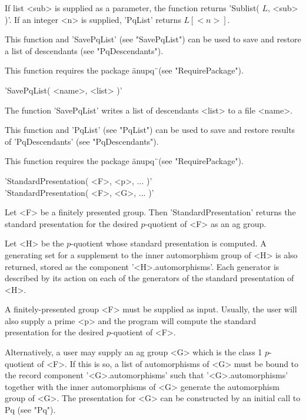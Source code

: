 If list <sub> is supplied as a parameter, the function  returns 'Sublist(
$L$, <sub> )'.  If an integer <n> is supplied, 'PqList' returns $L[<n>]$.

This  function  and  'SavePqList'  (see  "SavePqList")  can  be  used  to
save and restore a list of descendants (see "PqDescendants").

This function requires the package \"anupq\"\ (see "RequirePackage").


'SavePqList( <name>, <list> )'

The function 'SavePqList' writes a list of  descendants  <list> to a file
<name>.

This function and 'PqList' (see "PqList") can be used to save and restore
results of 'PqDescendants' (see "PqDescendants").

This function requires the package \"anupq\"\ (see "RequirePackage").


'StandardPresentation( <F>, <p>, ...  )' \\
'StandardPresentation( <F>, <G>, ...  )'

Let  <F> be  a  finitely  presented group.   Then  'StandardPresentation'
returns the standard presentation for the  desired $p$-quotient of <F> as
an ag group.

Let <H> be the  $p$-quotient whose standard presentation is  computed.  A
generating set for a supplement to the inner automorphism group of <H> is
also  returned,   stored  as  the  component  '<H>.automorphisms'.   Each
generator is described by  its  action on  each of the generators  of the
standard presentation of <H>.

A  finitely-presented group <F> must be  supplied  as input. Usually, the
user will  also  supply a prime  <p> and  the  program will  compute  the
standard presentation for the desired $p$-quotient of <F>.

Alternatively,  a  user may supply an ag group <G> which  is the class  1
$p$-quotient of <F>. If  this is  so, a list of automorphisms of <G> must
be   bound  to   the   record  component  '<G>.automorphisms'  such  that
'<G>.automorphisms' together with the inner automorphisms of <G> generate
the  automorphism  group  of  <G>.   The  presentation  for  <G>  can  be
constructed by an initial call to Pq (see "Pq").

